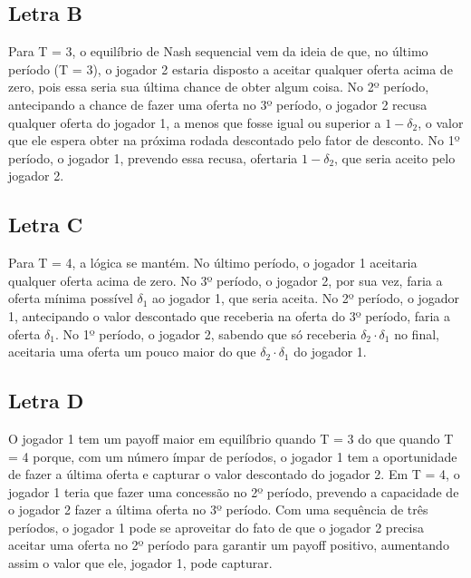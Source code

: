 \documentclass[a4paper,12pt]{article}[abntex2]
\begin{document}
\subsection{\textbf{Letra B}}
Para T = 3, o equilíbrio de Nash sequencial vem da ideia de que, no último período (T = 3), o jogador 2 estaria disposto a aceitar qualquer oferta acima de zero, pois essa seria sua última chance de obter algum coisa. No 2º período, antecipando a chance de fazer uma oferta no 3º período, o jogador 2 recusa qualquer oferta do jogador 1, a menos que fosse igual ou superior a \( 1 - \delta_2 \), o valor que ele espera obter na próxima rodada descontado pelo fator de desconto. No 1º período, o jogador 1, prevendo essa recusa, ofertaria \( 1 - \delta_2 \), que seria aceito pelo jogador 2.

\subsection{\textbf{Letra C}}
Para T = 4, a lógica se mantém. No último período, o jogador 1 aceitaria qualquer oferta acima de zero. No 3º período, o jogador 2, por sua vez, faria a oferta mínima possível \( \delta_1 \) ao jogador 1, que seria aceita. No 2º período, o jogador 1, antecipando o valor descontado que receberia na oferta do 3º período, faria a oferta \( \delta_1 \). No 1º período, o jogador 2, sabendo que só receberia \( \delta_2 \cdot \delta_1 \) no final, aceitaria uma oferta um pouco maior do que \( \delta_2 \cdot \delta_1 \) do jogador 1.

\subsection{\textbf{Letra D}}
O jogador 1 tem um payoff maior em equilíbrio quando T = 3 do que quando T = 4 porque, com um número ímpar de períodos, o jogador 1 tem a oportunidade de fazer a última oferta e capturar o valor descontado do jogador 2. Em T = 4, o jogador 1 teria que fazer uma concessão no 2º período, prevendo a capacidade de o jogador 2 fazer a última oferta no 3º período. Com uma sequência de três períodos, o jogador 1 pode se aproveitar do fato de que o jogador 2 precisa aceitar uma oferta no 2º período para garantir um payoff positivo, aumentando assim o valor que ele, jogador 1, pode capturar.
\end{document}
